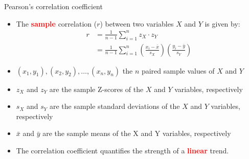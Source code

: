 \documentclass[10pt,handout]{beamer}\usepackage[]{graphicx}\usepackage[]{color}
\begin{document}
						
						\begin{frame}{Pearson's correlation coefficient}
							\protect\hypertarget{two-numerical-variables}{}
							
								\begin{itemize}
							
							\item The \textbf{\textcolor{red}{sample}} correlation ($r$) between two variables $X$ and $Y$ is given by:							
							\begin{align}
							r &= \frac{1}{n-1} \sum_{i=1}^n z_X \cdot z_Y \\ 
							&=\frac{1}{n-1} \sum_{i=1}^{n}\left(\frac{x_{i}-\bar{x}}{s_{X}}\right)\left(\frac{y_{i}-\bar{y}}{s_{Y}}\right)
							\end{align}
							
							\item $\left(x_{1}, y_{1}\right),\left(x_{2}, y_{2}\right), \ldots,\left(x_{n}, y_{n}\right)$ the $n$ paired sample values of $X$ and $Y$
							
							\item $z_{X}$ and $z_{Y}$ are the sample Z-scores of the $X$ and $Y$ variables, respectively 
							
							\item $s_{X}$ and $s_{Y}$ are the sample standard deviations of the $X$ and $Y$ variables, respectively 
							
							\item $\bar{x}$ and $\bar{y}$ are the sample means of the X and Y variables, respectively
							
							
							\pause 
							
							\item The correlation coefficient quantifies the strength of a \textbf{\textcolor{red}{linear}} trend.
							
						
													\end{itemize}
							
							
						\end{frame}
						
\end{document}
